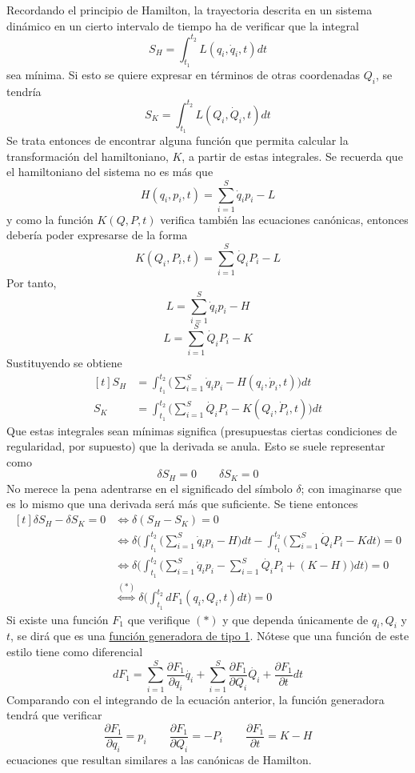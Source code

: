 \documentclass[12pt]{report}
\begin{document}
Recordando el principio de Hamilton, la trayectoria descrita en un sistema dinámico en un cierto intervalo de tiempo ha de verificar que la integral
\[S_H = \int_{t_1}^{t_2}L(q_i, \dot{q}_i,t)dt\]
sea mínima. Si esto se quiere expresar en términos de otras coordenadas $Q_i$, se tendría
\[S_K = \int_{t_1}^{t_2}L(Q_i, \dot{Q}_i,t)dt\]
Se trata entonces de encontrar alguna función que permita calcular la transformación del hamiltoniano, $K$, a partir de estas integrales. Se recuerda que el hamiltoniano del sistema no es más que
\[H(q_i,p_i,t) =\sum_{i=1}^S \dot{q}_ip_i  - L\]
y como la función $K(Q,P,t)$ verifica también las ecuaciones canónicas, entonces debería poder expresarse de la forma
\[K(Q_i,P_i,t) = \sum_{i=1}^S \dot{Q}_iP_i-L\]
Por tanto,
\[L = \sum_{i=1}^S \dot{q}_ip_i - H\]
\[L = \sum_{i=1}^S \dot{Q}_iP_i-K\]
Sustituyendo se obtiene
\[
\begin{aligned}[t]
   S_H &= \int_{t_1}^{t_2} \biggl(\sum_{i=1}^S \dot{q}_ip_i - H(q_i,\dot{p}_i,t)\biggr) dt \\
   S_K &= \int_{t_1}^{t_2} \biggl(\sum_{i=1}^S \dot{Q}_iP_i-K(Q_i,\dot{P}_i,t)\biggr) dt
\end{aligned}
\]
Que estas integrales sean mínimas significa (presupuestas ciertas condiciones de regularidad, por supuesto) que la derivada se anula. Esto se suele representar como
\[\delta S_H = 0 \qquad \delta S_K = 0\]
No merece la pena adentrarse en el significado del símbolo $\delta$; con imaginarse que es lo mismo que una derivada será más que suficiente. Se tiene entonces
\[
\begin{aligned}[t]
   \delta S_H - \delta S_K = 0 &\iff \delta (S_H - S_K) = 0 \\
   &\iff \delta \biggl( \int_{t_1}^{t_2} \biggl(\sum_{i=1}^S \dot{q}_ip_i - H\biggr) dt - \int_{t_1}^{t_2} \biggl(\sum_{i=1}^S \dot{Q}_iP_i-K dt\biggr) = 0 \\
   &\iff \delta \biggl( \int_{t_1}^{t_2} \biggl( \sum_{i=1}^S \dot{q}_ip_i - \sum_{i=1}^S \dot{Q_i}P_i +(K-H) \biggr) dt \biggr) = 0 \\
   &\overset{(*)}{\iff} \delta \biggl( \int_{t_1}^{t_2} dF_1(q_i, Q_i, t) dt \biggr) = 0
\end{aligned}
\]
Si existe una función $F_1$ que verifique $(*)$ y que dependa únicamente de $q_i, Q_i$ y $t$, se dirá que es una \ul{función generadora de tipo 1}. Nótese que una función de este estilo tiene como diferencial
\[dF_1 = \sum_{i=1}^S \frac{\partial F_1}{\partial q_i}\dot{q_i}+\sum_{i=1}^S \frac{\partial F_1}{\partial Q_i}\dot{Q_i}+\frac{\partial F_1}{\partial t}dt\]
Comparando con el integrando de la ecuación anterior, la función generadora tendrá que verificar
\[\frac{\partial F_1}{\partial q_i} = p_i \qquad \frac{\partial F_1}{\partial Q_i} = -P_i \qquad \frac{\partial F_1}{\partial t} = K-H\]
ecuaciones que resultan similares a las canónicas de Hamilton.
\end{document}
